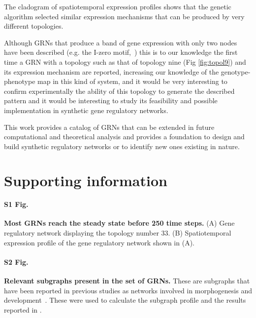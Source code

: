 \documentclass[10pt,letterpaper]{article}
\begin{document}
The cladogram of spatiotemporal expression profiles shows that the genetic
algorithm selected similar expression mechanisms that can be produced by very
different topologies.

Although GRNs that produce a band of gene expression with only two nodes have
been described (e.g. the I-zero motif,~\cite{Schaerli2014}) this is to our
knowledge the first time a GRN with a topology such as that of topology nine
(Fig \ref{fig:topol9})
and its expression mechanism are reported, increasing our knowledge of the
genotype-phenotype map in this kind of system, and it would be very interesting
to confirm experimentally the ability of this topology to generate the described
pattern and it would be interesting to study its feasibility and possible
implementation in synthetic gene regulatory networks.

This work provides a catalog of GRNs that can be extended in future computational
and theoretical analysis and provides a foundation to design and build synthetic
regulatory networks or to identify new ones existing in nature.



\section*{Supporting information}


\paragraph*{S1 Fig.}
\label{S1_Fig}
{\bf Most GRNs reach the steady state before 250 time steps.}
(A) Gene regulatory network displaying the topology number 33. (B) Spatiotemporal
expression profile of the gene regulatory network shown in (A).

\paragraph*{S2 Fig.}
\label{S2_Fig}
{\bf Relevant subgraphs present in the set of GRNs.}
These are subgraphs that have been reported in previous studies as networks
involved in morphogenesis and development~\cite{Cotterell2010, Schaerli2014,
Schaerli2018}. These were used to calculate the subgraph profile and the results
reported in .
\end{document}
